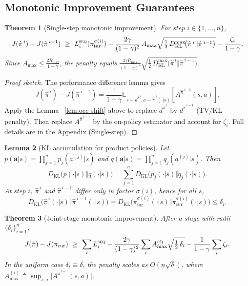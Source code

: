 \documentclass[sigconf]{aamas}
\newtheorem{theorem}{Theorem}[section]
\newtheorem{lemma}[theorem]{Lemma}
\newcommand{\E}{\mathbb{E}}
\newcommand{\KL}{D_{\mathrm{KL}}}
\begin{document}
\subsection{Monotonic Improvement Guarantees}
\begin{theorem}[Single-step monotonic improvement]\label{thm:single}
For step $i\in\{1,\ldots,n\}$,
\[
J(\hat\pi^{\,i})-J(\hat\pi^{\,i-1})
\ \ge\
L_i^{\textsc{seq}}(\pi^{\sigma(i)}_{\mathrm{tar}})
-\frac{2\gamma}{(1-\gamma)^2}\,A_{\max}\sqrt{\tfrac12\,\KL^{\max}\!\big(\hat\pi^{\,i}\Vert\hat\pi^{\,i-1}\big)}
-\frac{\zeta_i}{1-\gamma}.
\]
Since $A_{\max}\le \tfrac{2R_{\max}}{1-\gamma}$, the penalty equals
$\tfrac{4\gamma R_{\max}}{(1-\gamma)^{3}}\sqrt{\tfrac12\,\KL^{\max}\!\big(\hat\pi^{\,i}\Vert\hat\pi^{\,i-1}\big)}$.
\end{theorem}

\begin{proof}[Proof sketch]
The performance difference lemma gives
\[
J(\hat\pi^{\,i})-J(\hat\pi^{\,i-1})
=\frac{1}{1-\gamma}\E_{s \sim d^{\hat\pi^{\,i}}, a\sim \hat\pi^{\,i}(\cdot|s)}[A^{\hat\pi^{\,i-1}}(s,a)].
\]
Apply the Lemma ~\ref{lem:occ-shift} above to replace $d^{\hat\pi^{\,i}}$ by $d^{\hat\pi^{\,i-1}}$ (TV/KL penalty). Then replace $A^{\hat\pi^{\,i-1}}$ by the on-policy estimator and account for $\zeta_i$. Full details are in the Appendix (Single-step).
\end{proof}

\begin{lemma}[KL accumulation for product policies]\label{lem:klstep}
Let $p(\mathbf a|s)=\prod_{j=1}^n p_j(a^{(j)}|s)$ and $q(\mathbf a|s)=\prod_{j=1}^n q_j(a^{(j)}|s)$. Then
\[
  \KL\!\big(p(\cdot|s)\Vert q(\cdot|s)\big)=\sum_{j=1}^n \KL\!\big(p_j(\cdot|s)\Vert q_j(\cdot|s)\big).
\]
At step $i$, $\hat\pi^{\,i}$ and $\hat\pi^{\,i-1}$ differ only in factor $\sigma(i)$, hence for all $s$,
\[
  \KL\!\big(\hat\pi^{\,i}(\cdot|s)\Vert \hat\pi^{\,i-1}(\cdot|s)\big)
  =\KL\!\big(\pi^{\sigma(i)}_{\mathrm{tar}}(\cdot|s)\Vert\pi^{\sigma(i)}_{\mathrm{cur}}(\cdot|s)\big)\le \delta_i.
\]
\end{lemma}

\begin{theorem}[Joint-stage monotonic improvement]\label{thm:joint}
After a stage with radii $\{\delta_i\}_{i=1}^{n}$,
\[
J(\bar\pi)-J(\pi_{\mathrm{cur}})
\ \ge\
\sum_i L_i^{\textsc{seq}}
-\frac{2\gamma}{(1-\gamma)^2}\sum_i A_{\max}^{(i)}\sqrt{\tfrac12\,\delta_i}
-\frac{1}{1-\gamma}\sum_i \zeta_i.
\]
In the uniform case $\delta_i\equiv\delta$, the penalty scales as $O(n\sqrt{\delta})$, where $A_{\max}^{(i)} \triangleq \sup_{s,a}\big|A^{\hat\pi^{\,i-1}}(s,a)\big|$.
\end{theorem}
\end{document}
